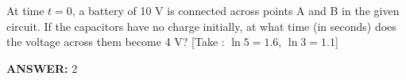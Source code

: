 
\item At time \( t = 0 \), a battery of 10 V is connected across points A and B in the given circuit. If the capacitors have no charge initially, at what time (in seconds) does the voltage across them become 4 V?
[Take : \(\ln 5 = 1.6\), \(\ln 3 = 1.1\)]

\textbf{ANSWER:} 2

